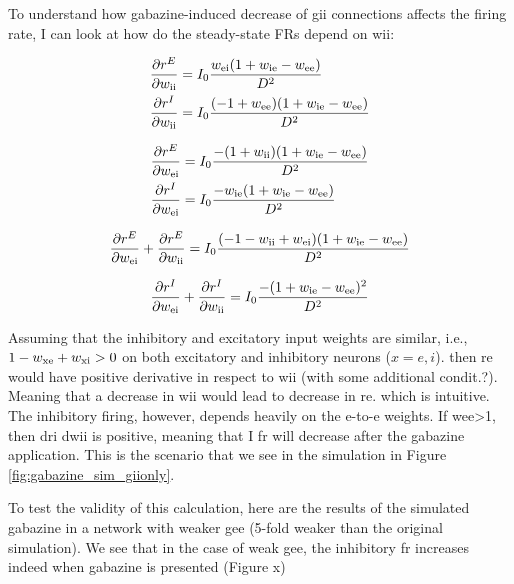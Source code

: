     To understand how gabazine-induced decrease of gii connections affects the
    firing rate, I can look at how do the steady-state FRs depend on wii:

    \begin{equation}
      \begin{split}
        \frac{\partial r^E}{\partial w_{\rm ii}} &= I_0 \frac{w_{\rm ei} (1 + w_{\rm ie} - w_{\rm ee})} {D^2} \\
        \frac{\partial r^I}{\partial w_{\rm ii}} &= I_0 \frac{(-1 + w_{\rm ee})(1 + w_{\rm ie} - w_{\rm ee})} {D^2} \\
      \end{split}
      \label{eq:drdwii}
    \end{equation}
  
    \begin{equation}
      \begin{split}
        \frac{\partial r^E}{\partial w_{\rm ei}} &= I_0 \frac{-(1 + w_{\rm ii}) (1 + w_{\rm ie} - w_{\rm ee})} {D^2} \\
        \frac{\partial r^I}{\partial w_{\rm ei}} &= I_0 \frac{-w_{\rm ie} (1 + w_{\rm ie} - w_{\rm ee})} {D^2} \\
      \end{split}
      \label{eq:drdwei}
    \end{equation}


    \[
      \frac{\partial r^E}{\partial w_{\rm ei}} + \frac{\partial r^E}{\partial w_{\rm ii}} =  I_0 \frac{(-1 - w_{\rm ii} + w_{\rm ei}) (1 + w_{\rm ie} - w_{\rm ee})} {D^2} 
    \]

    \[
      \frac{\partial r^I}{\partial w_{\rm ei}} + \frac{\partial r^I}{\partial w_{\rm ii}} =  I_0 \frac{- (1 + w_{\rm ie} - w_{\rm ee})^2} {D^2} 
    \]

    Assuming that the inhibitory and excitatory input weights are similar,
    i.e., $1 - w_{\rm xe} + w_{\rm xi} > 0$ on both excitatory and inhibitory
    neurons ($x=e,i$). then re would have positive derivative in respect to wii
    (with some additional condit.?). Meaning that a decrease in wii would lead
    to decrease in re. which is intuitive. The inhibitory firing, however,
    depends heavily on the e-to-e weights. If wee>1, then dri dwii is positive,
    meaning that I fr will decrease after the gabazine application. This is the
    scenario that we see in the simulation in Figure
    \ref{fig:gabazine_sim_giionly}.

    To test the validity of this calculation, here are the results of the
    simulated gabazine in a network with weaker gee (5-fold weaker than the
    original simulation). We see that in the case of weak gee, the inhibitory
    fr increases indeed when gabazine is presented (Figure x)

